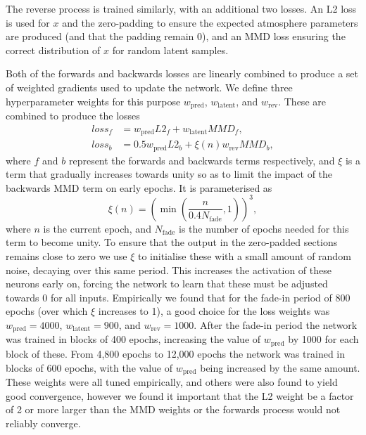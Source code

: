 The reverse process is trained similarly, with an additional two losses.
An L2 loss is used for $x$ and the zero-padding to ensure the expected atmosphere parameters are produced (and that the padding remain 0), and an MMD loss ensuring the correct distribution of $x$ for random latent samples.

Both of the forwards and backwards losses are linearly combined to produce a set of weighted gradients used to update the network.
We define three hyperparameter weights for this purpose $w_\mathrm{pred}$, $w_\mathrm{latent}$, and $w_\mathrm{rev}$.
These are combined to produce the losses
\begin{align}
    loss_f &= w_\mathrm{pred} L2_f + w_\mathrm{latent} MMD_f,\\
    loss_b &= 0.5w_\mathrm{pred} L2_b + \xi(n)w_\mathrm{rev} MMD_b,
\end{align}
where $f$ and $b$ represent the forwards and backwards terms respectively, and $\xi$ is a term that gradually increases towards unity so as to limit the impact of the backwards MMD term on early epochs.
It is parameterised as
\begin{equation}
    \xi(n) = \left( \min\left( \frac{n}{0.4 N_\mathrm{fade}}, 1 \right) \right)^3,
\end{equation}
where $n$ is the current epoch, and $N_\mathrm{fade}$ is the number of epochs needed for this term to become unity.
To ensure that the output in the zero-padded sections remains close to zero we use $\xi$ to initialise these with a small amount of random noise, decaying over this same period.
This increases the activation of these neurons early on, forcing the network to learn that these must be adjusted towards 0 for all inputs.
Empirically we found that for the fade-in period of 800 epochs (over which $\xi$ increases to 1), a good choice for the loss weights was $w_\mathrm{pred}=4000$, $w_\mathrm{latent}=900$, and $w_\mathrm{rev}=1000$.
After the fade-in period the network was trained in blocks of 400 epochs, increasing the value of $w_\mathrm{pred}$ by 1000 for each block of these.
From 4,800 epochs to 12,000 epochs the network was trained in blocks of 600 epochs, with the value of $w_\mathrm{pred}$ being increased by the same amount.
These weights were all tuned empirically, and others were also found to yield good convergence, however we found it important that the L2 weight be a factor of 2 or more larger than the MMD weights or the forwards process would not reliably converge.

